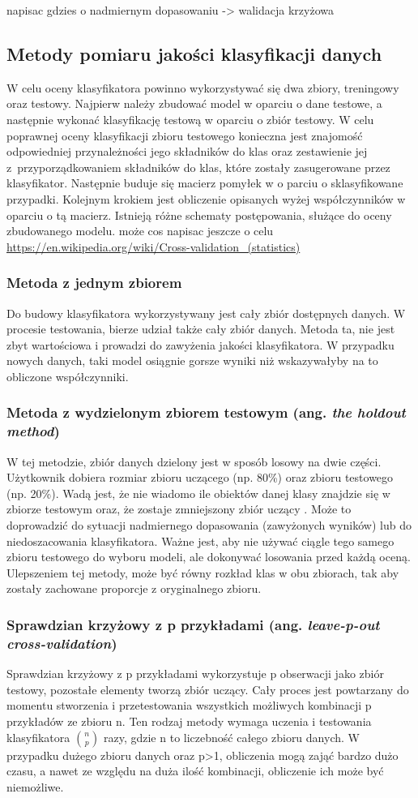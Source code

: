  napisac gdzies o nadmiernym dopasowaniu -> walidacja krzyżowa
\subsection{Metody pomiaru jakości klasyfikacji danych}
W celu oceny klasyfikatora powinno wykorzystywać się dwa zbiory, treningowy oraz testowy. Najpierw należy zbudować model w oparciu o dane testowe, a następnie wykonać klasyfikację testową w oparciu o zbiór testowy. W celu poprawnej oceny klasyfikacji zbioru testowego konieczna jest znajomość odpowiedniej przynależności jego składników do klas oraz zestawienie jej z przyporządkowaniem składników do klas, które zostały zasugerowane przez klasyfikator. Następnie buduje się macierz pomyłek w o parciu o sklasyfikowane przypadki. Kolejnym krokiem jest obliczenie opisanych wyżej współczynników w oparciu o tą macierz. Istnieją różne schematy postępowania, służące do oceny zbudowanego modelu.
 może cos napisac jeszcze o celu \url{https://en.wikipedia.org/wiki/Cross-validation_(statistics)} 
\subsubsection{Metoda z jednym zbiorem}
Do budowy klasyfikatora wykorzystywany jest cały zbiór dostępnych danych. W procesie testowania, bierze udział także cały zbiór danych. Metoda ta, nie jest zbyt wartościowa i prowadzi do zawyżenia jakości klasyfikatora. W przypadku nowych danych, taki model osiągnie gorsze wyniki niż wskazywałyby na to obliczone współczynniki.
\subsubsection{Metoda z wydzielonym zbiorem testowym (ang. \textit{the holdout method})}
W tej metodzie, zbiór danych dzielony jest w sposób losowy na dwie części. Użytkownik dobiera rozmiar zbioru uczącego (np. 80\%) oraz zbioru testowego (np. 20\%). Wadą jest, że nie wiadomo ile obiektów danej klasy znajdzie się w zbiorze testowym oraz, że zostaje zmniejszony zbiór uczący . Może to doprowadzić do sytuacji nadmiernego dopasowania (zawyżonych wyników) lub do niedoszacowania klasyfikatora. Ważne jest, aby nie używać ciągle tego samego zbioru testowego do wyboru modeli, ale dokonywać losowania przed każdą oceną.\\
Ulepszeniem tej metody, może być równy rozkład klas w obu zbiorach, tak aby zostały zachowane proporcje z oryginalnego zbioru.
\subsubsection{Sprawdzian krzyżowy z p przykładami (ang. \textit{leave-p-out cross-validation})}
Sprawdzian krzyżowy z p przykładami wykorzystuje p obserwacji jako zbiór testowy, pozostałe elementy tworzą zbiór uczący. Cały proces jest powtarzany do momentu stworzenia i przetestowania wszystkich możliwych kombinacji p przykładów ze zbioru n. Ten rodzaj metody wymaga uczenia i testowania klasyfikatora $\binom{n}{p}$ razy, gdzie n to liczebność całego zbioru danych. W przypadku dużego zbioru danych oraz p>1, obliczenia mogą zająć bardzo dużo czasu, a nawet ze względu na duża ilość kombinacji, obliczenie ich może być niemożliwe.
